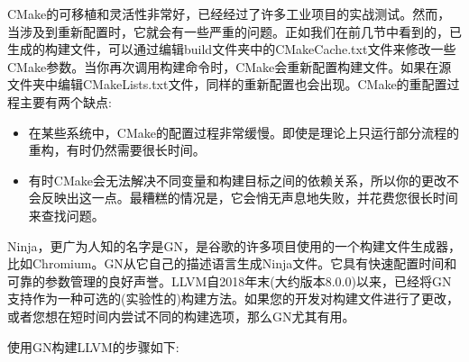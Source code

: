 CMake的可移植和灵活性非常好，已经经过了许多工业项目的实战测试。然而，当涉及到重新配置时，它就会有一些严重的问题。正如我们在前几节中看到的，已生成的构建文件，可以通过编辑build文件夹中的CMakeCache.txt文件来修改一些CMake参数。当你再次调用构建命令时，CMake会重新配置构建文件。如果在源文件夹中编辑CMakeLists.txt文件，同样的重新配置也会出现。CMake的重配置过程主要有两个缺点:

\begin{itemize}
\item 在某些系统中，CMake的配置过程非常缓慢。即使是理论上只运行部分流程的重构，有时仍然需要很长时间。

\item 有时CMake会无法解决不同变量和构建目标之间的依赖关系，所以你的更改不会反映出这一点。最糟糕的情况是，它会悄无声息地失败，并花费您很长时间来查找问题。
	
\end{itemize}

Ninja，更广为人知的名字是GN，是谷歌的许多项目使用的一个构建文件生成器，比如Chromium。GN从它自己的描述语言生成Ninja文件。它具有快速配置时间和可靠的参数管理的良好声誉。LLVM自2018年末(大约版本8.0.0)以来，已经将GN支持作为一种可选的(实验性的)构建方法。如果您的开发对构建文件进行了更改，或者您想在短时间内尝试不同的构建选项，那么GN尤其有用。

使用GN构建LLVM的步骤如下:

